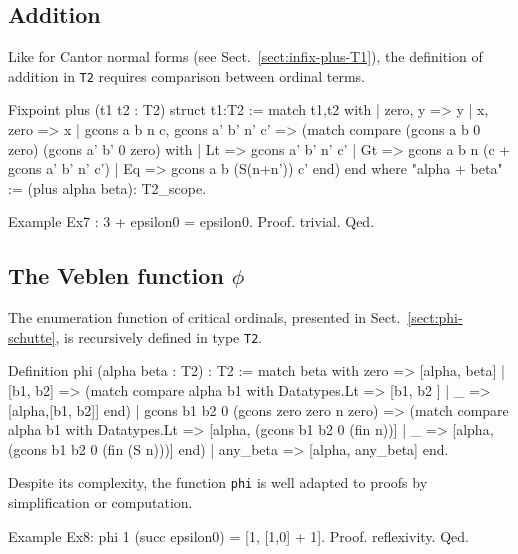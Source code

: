 {\subsection{Addition}

Like for Cantor normal forms (see Sect.~\ref{sect:infix-plus-T1}),  the definition of addition in \texttt{T2}  requires comparison between ordinal terms.


\begin{Coqsrc}
Fixpoint plus (t1 t2 : T2) {struct t1}:T2 :=
  match t1,t2 with
  |  zero, y  => y
  |  x, zero => x
  |  gcons a b n c, gcons a' b' n' c' =>
     (match compare (gcons a b 0 zero)
                    (gcons a' b' 0 zero) with
      | Lt => gcons a' b' n' c'
      | Gt => gcons a b n (c + gcons a' b' n' c')
      | Eq => gcons a b (S(n+n')) c'
      end)
  end
where "alpha + beta" := (plus alpha beta): T2_scope.
\end{Coqsrc}

\begin{Coqsrc}
Example Ex7 : 3 + epsilon0 = epsilon0.
Proof. trivial. Qed.
\end{Coqsrc}

\subsection{The Veblen function \texorpdfstring{$\phi$}{\texttt{phi}}}

The enumeration function of critical ordinals, presented in Sect.~\vref{sect:phi-schutte}, is recursively defined in type \texttt{T2}.

\begin{Coqsrc}
Definition  phi (alpha beta : T2) : T2 :=
  match beta with zero => [alpha, beta] 
             | [b1, b2] => 
               (match compare alpha b1
                with Datatypes.Lt => [b1, b2 ]
                | _ => [alpha,[b1, b2]]
                end)
             | gcons b1 b2 0 (gcons zero zero  n zero) => 
               (match compare alpha b1
                with  Datatypes.Lt => 
                      [alpha, (gcons b1 b2 0 (fin n))]
                | _ =>  [alpha, (gcons b1 b2 0 (fin (S n)))]
                end)
             | any_beta => [alpha, any_beta]
  end.
\end{Coqsrc}

Despite its complexity, the function \texttt{phi} is well adapted to proofs by simplification or computation.
\begin{Coqsrc}
Example Ex8:  phi 1 (succ epsilon0) = [1, [1,0] + 1].
Proof. reflexivity. Qed.
\end{Coqsrc}

}
